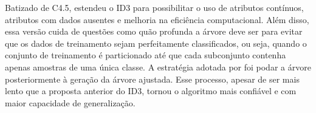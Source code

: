 Batizado de C4.5, \citet{quinlan:93} estendeu o ID3 para possibilitar o uso de atributos contínuos, atributos com dados ausentes e melhoria na eficiência computacional. Além disso, essa versão cuida de questões como quão profunda a árvore deve ser para evitar que os dados de treinamento sejam perfeitamente classificados, ou seja, quando o conjunto de treinamento é particionado até que cada subconjunto contenha apenas amostras de uma única classe. A estratégia adotada por \citet{quinlan:93} foi podar a árvore posteriormente à geração da árvore ajustada. Esse processo, apesar de ser mais lento que a proposta anterior do ID3, tornou o algoritmo mais confiável e com maior capacidade de generalização.


